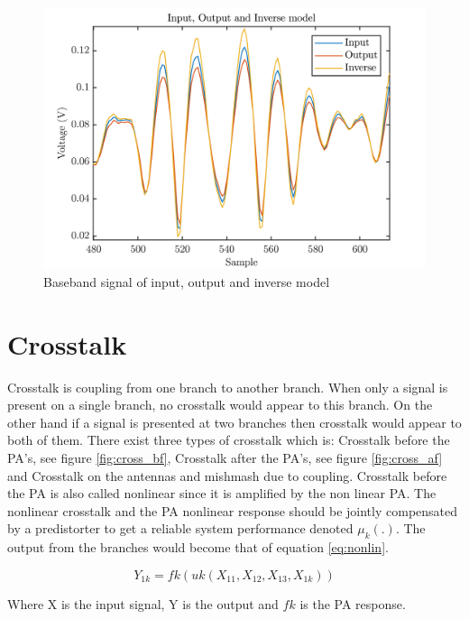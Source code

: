 \begin{figure}[H]
\centering 
\includegraphics[scale = 0.7]{figures/measurement/inoutmodel.png}
\caption{Baseband signal of input, output and inverse model}
\label{fig:pre_cons}
\end{figure}



\section{Crosstalk}
Crosstalk is coupling from one branch to another branch. When only a signal is present on a single branch, no crosstalk would appear to this branch. On the other hand if a signal is presented at two branches then crosstalk would appear to both of them. There exist three types of crosstalk which is: Crosstalk before the PA's, see figure \ref{fig:cross_bf}, Crosstalk after the PA's, see figure \ref{fig:cross_af} and Crosstalk on the antennas and mishmash due to coupling. Crosstalk before the PA is also called nonlinear since it is amplified by the non linear PA. The nonlinear crosstalk and the PA nonlinear response should be jointly
compensated by a predistorter to get a reliable system performance \citep{islam2017} denoted $\mu_k (.)$. The output from the branches would become that of equation \ref{eq:nonlin}.

\begin{equation} \label{eq:nonlin}
Y_{1k} = fk(uk(X_{11},X_{12},X_{13},X_{1k}))
\end{equation}   

Where X is the input signal, Y is the output and $fk$ is the PA response. 

